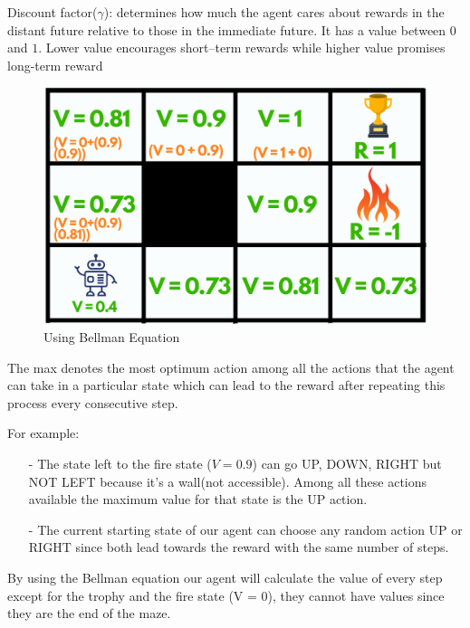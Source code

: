 Discount factor($\gamma$): determines how much the agent cares about rewards 
in the distant future relative to those in the immediate future. It has a value 
between $0$ and $1$. Lower value encourages short–term rewards while higher 
value promises long-term reward

\begin{figure}[!htb]
\centering
\includegraphics[scale=0.3]{pix/maze_bellman.png}
\caption{Using Bellman Equation}
\end{figure}

The max denotes the most optimum action among all the actions that the agent can 
take in a particular state which can lead to the reward after repeating this 
process every consecutive step.  

For example:

\begin{itemize}
\setlength{\parskip}{0pt}
\item[-]
The state left to the fire state ($V = 0.9$) can go UP, DOWN, RIGHT but NOT LEFT 
because it's a wall(not accessible). Among all these actions available the maximum 
value for that state is the UP action.

\item[-]
The current starting state of our agent can choose any random action UP or RIGHT 
since both lead towards the reward with the same number of steps.
\end{itemize}

By using the Bellman equation our agent will calculate the value of every step 
except for the trophy and the fire state (V = 0), they cannot have values since 
they are the end of the maze.

